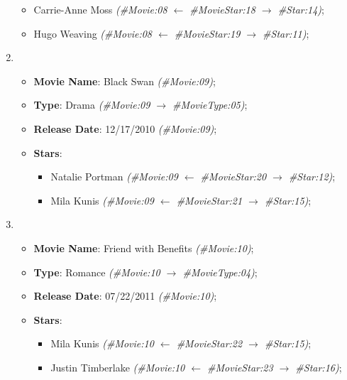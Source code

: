 \begin{enumerate}
{\begin{itemize}
{\begin{itemize}
							\item{Carrie-Anne Moss \textit{(\#Movie:08 $\gets$ \#MovieStar:18 $\to$ \#Star:14)};}
							\item{Hugo Weaving \textit{(\#Movie:08 $\gets$ \#MovieStar:19 $\to$ \#Star:11)};}
						\end{itemize}}
				\end{itemize}}
			\item{%
				\begin{itemize}
					\item{\textbf{Movie Name}: Black Swan \textit{(\#Movie:09)};}
					\item{\textbf{Type}: Drama \textit{(\#Movie:09 $\to$ \#MovieType:05)};}
					\item{\textbf{Release Date}: 12/17/2010 \textit{(\#Movie:09)};}
					\item{\textbf{Stars}:
						\begin{itemize}
							\item{Natalie Portman \textit{(\#Movie:09 $\gets$ \#MovieStar:20 $\to$ \#Star:12)};}
							\item{Mila Kunis \textit{(\#Movie:09 $\gets$ \#MovieStar:21 $\to$ \#Star:15)};}
						\end{itemize}}
				\end{itemize}}
			\item{%
				\begin{itemize}
					\item{\textbf{Movie Name}: Friend with Benefits \textit{(\#Movie:10)};}
					\item{\textbf{Type}: Romance \textit{(\#Movie:10 $\to$ \#MovieType:04)};}
					\item{\textbf{Release Date}: 07/22/2011 \textit{(\#Movie:10)};}
					\item{\textbf{Stars}:
						\begin{itemize}
							\item{Mila Kunis \textit{(\#Movie:10 $\gets$ \#MovieStar:22 $\to$ \#Star:15)};}
							\item{Justin Timberlake \textit{(\#Movie:10 $\gets$ \#MovieStar:23 $\to$ \#Star:16)};}
						\end{itemize}}
				\end{itemize}}
	\end{enumerate}
